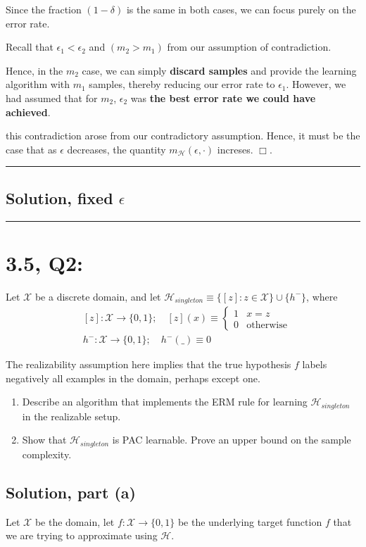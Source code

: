 \documentclass[11pt]{article}
\renewcommand{\H}{\ensuremath{\mathcal{H}}}
\newcommand{\X}{\ensuremath{\mathcal{X}}}
\def\qed{$\Box$}
\begin{document}
Since the fraction $(1 - \delta)$ is the same in both cases, we can focus
purely on the error rate.

Recall that $\epsilon_1 < \epsilon_2$ and $(m_2 > m_1)$ from our assumption
of contradiction.

Hence, in the $m_2$ case, we can simply \textbf{discard samples} and provide
the learning algorithm with $m_1$ samples, thereby reducing our error
rate to $\epsilon_1$. However, we had assumed that for $m_2$, $\epsilon_2$
was \textbf{the best error rate we could have achieved}.

this contradiction arose from our contradictory assumption. Hence, it
must be the case that as $\epsilon$ decreases, the quantity $m_\H(\epsilon, \cdot)$
increses. \qed.

\rule{\textwidth}{0.1pt}

\subsection*{Solution, fixed $\epsilon$}

\rule{\textwidth}{1pt}
\section*{3.5, Q2:} 
Let $\X$ be a discrete domain, and let 
$\H_{singleton} \equiv \{ [z] : z \in \X \} \cup \{h^− \}$, where
\begin{align*}
&[z]: \X \rightarrow \{0,1\};  \quad [z](x) \equiv \begin{cases} 1 & x = z \\ 0 & \text{otherwise} \end{cases}\\
&h^−: \X \rightarrow \{0, 1\}; \quad h^-(\_) \equiv 0
\end{align*}

The realizability assumption here implies that the true hypothesis $f$ labels
negatively all examples in the domain, perhaps except one.

\begin{enumerate}
    \item Describe an algorithm that implements the ERM rule for learning
        $\H_{singleton}$ in the realizable setup.
    \item Show that $\H_{singleton}$ is PAC learnable. Prove an upper
        bound on the sample complexity.
\end{enumerate}

\subsection*{Solution, part (a)}
Let $\X$ be the domain, let $f: \X \rightarrow \{0, 1\}$ be the underlying
target function $f$ that we are trying to approximate using $\H$.
\end{document}
